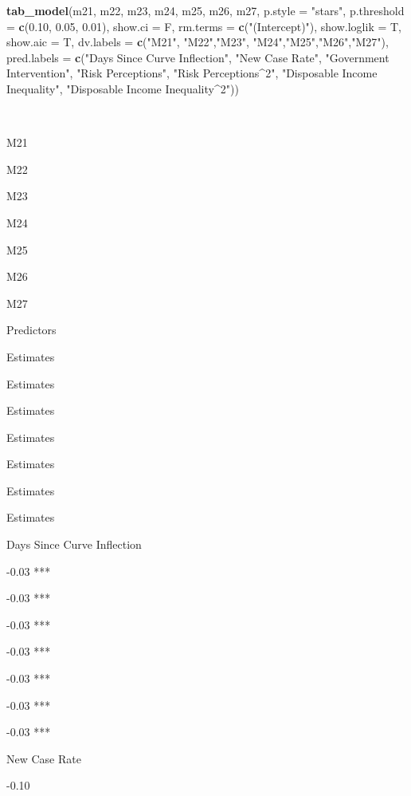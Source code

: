 \documentclass[
]{article}
\newenvironment{Shaded}{\begin{snugshade}}{\end{snugshade}}
\newcommand{\DataTypeTok}[1]{\textcolor[rgb]{0.13,0.29,0.53}{#1}}
\newcommand{\FloatTok}[1]{\textcolor[rgb]{0.00,0.00,0.81}{#1}}
\newcommand{\KeywordTok}[1]{\textcolor[rgb]{0.13,0.29,0.53}{\textbf{#1}}}
\newcommand{\NormalTok}[1]{#1}
\newcommand{\StringTok}[1]{\textcolor[rgb]{0.31,0.60,0.02}{#1}}
\begin{document}
\begin{Shaded}
\begin{Highlighting}[]
\KeywordTok{tab_model}\NormalTok{(m21, m22, m23, m24, m25, m26, m27, }\DataTypeTok{p.style =} \StringTok{"stars"}\NormalTok{, }\DataTypeTok{p.threshold =} \KeywordTok{c}\NormalTok{(}\FloatTok{0.10}\NormalTok{, }\FloatTok{0.05}\NormalTok{, }\FloatTok{0.01}\NormalTok{), }\DataTypeTok{show.ci =}\NormalTok{ F, }\DataTypeTok{rm.terms =} \KeywordTok{c}\NormalTok{(}\StringTok{"(Intercept)"}\NormalTok{), }\DataTypeTok{show.loglik =}\NormalTok{ T, }\DataTypeTok{show.aic =}\NormalTok{ T, }\DataTypeTok{dv.labels =} \KeywordTok{c}\NormalTok{(}\StringTok{"M21"}\NormalTok{, }\StringTok{"M22"}\NormalTok{,}\StringTok{"M23"}\NormalTok{, }\StringTok{"M24"}\NormalTok{,}\StringTok{"M25"}\NormalTok{,}\StringTok{"M26"}\NormalTok{,}\StringTok{"M27"}\NormalTok{), }\DataTypeTok{pred.labels =} \KeywordTok{c}\NormalTok{(}\StringTok{"Days Since Curve Inflection"}\NormalTok{, }\StringTok{"New Case Rate"}\NormalTok{, }\StringTok{"Government Intervention"}\NormalTok{, }\StringTok{"Risk Perceptions"}\NormalTok{, }\StringTok{"Risk Perceptions^2"}\NormalTok{, }\StringTok{"Disposable Income Inequality"}\NormalTok{, }\StringTok{"Disposable Income Inequality^2"}\NormalTok{))}
\end{Highlighting}
\end{Shaded}

~

M21

M22

M23

M24

M25

M26

M27

Predictors

Estimates

Estimates

Estimates

Estimates

Estimates

Estimates

Estimates

Days Since Curve Inflection

-0.03 ***

-0.03 ***

-0.03 ***

-0.03 ***

-0.03 ***

-0.03 ***

-0.03 ***

New Case Rate

-0.10
\end{document}
